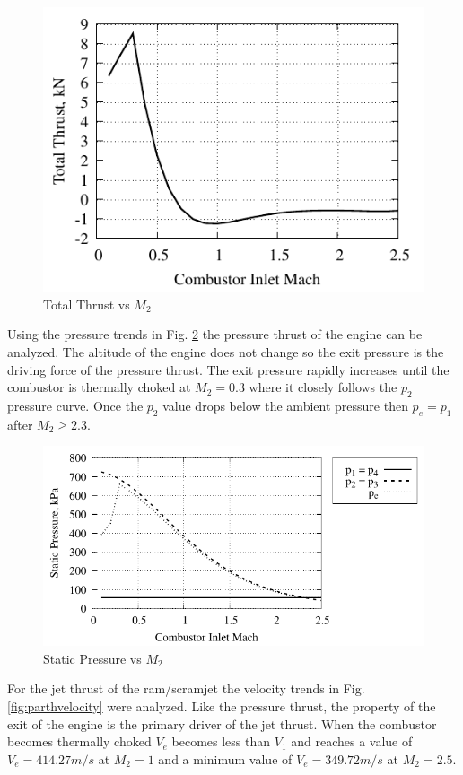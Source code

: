 \documentclass[conf]{new-aiaa} %
\begin{document}
\begin{figure}[H] %
    \centering
    \includegraphics[]{media/performance_parameter_files/part_h_T.pdf}
    \caption{\label{fig:partht}Total Thrust vs \texorpdfstring{\textit{$M_2$}}{M2}}
\end{figure}
Using the pressure trends in Fig. \ref{fig:parthstatpress} the pressure thrust of the engine can be analyzed. The altitude of the engine does not change so the exit pressure is the driving force of the pressure thrust. The exit pressure rapidly increases until the combustor is thermally choked at $M_2=0.3$ where it closely follows the $p_2$ pressure curve. Once the $p_2$ value drops below the ambient pressure then $p_e=p_1$ after $M_2\geq2.3$.

\begin{figure}[H] %
    \centering
    \includegraphics[]{media/performance_parameter_files/part_h_static_pressure.pdf}
    \caption{\label{fig:parthstatpress}Static Pressure vs \texorpdfstring{\textit{$M_2$}}{M2}}
\end{figure}
For the jet thrust of the ram/scramjet the velocity trends in Fig. \ref{fig:parthvelocity} were analyzed. Like the pressure thrust, the property of the exit of the engine is the primary driver of the jet thrust. When the combustor becomes thermally choked $V_e$ becomes less than $V_1$ and reaches a value of $V_e=414.27m/s$ at $M_2=1$ and a minimum value of $V_e=349.72m/s$ at $M_2=2.5$.
\end{document}
